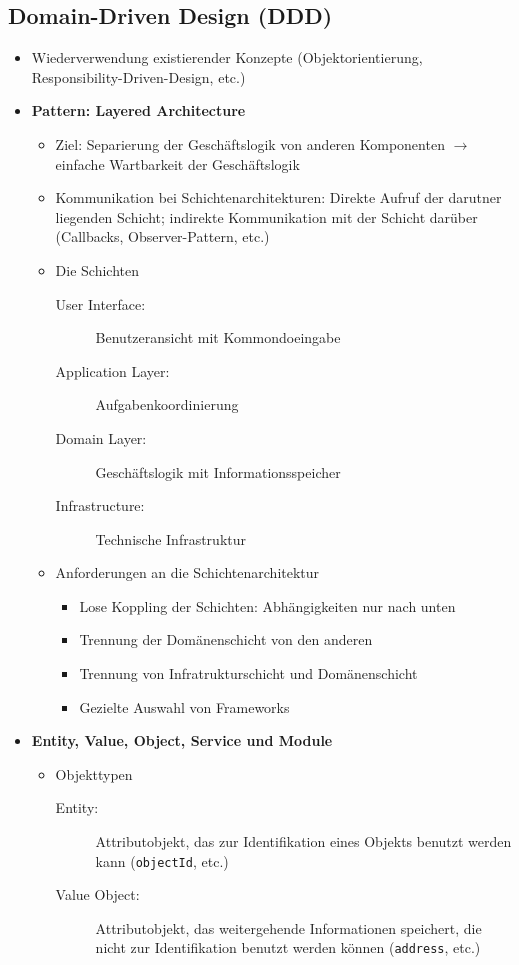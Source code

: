 \subsection{Domain-Driven Design (DDD)}
\begin{itemize}
	\item Wiederverwendung existierender Konzepte (Objektorientierung, Responsibility-Driven-Design, etc.)
	\item \textbf{Pattern: Layered Architecture}
	\begin{itemize}
		\item Ziel: Separierung der Geschäftslogik von anderen Komponenten \(\rightarrow\) einfache Wartbarkeit der Geschäftslogik
		\item Kommunikation bei Schichtenarchitekturen: Direkte Aufruf der darutner liegenden Schicht; indirekte Kommunikation mit der Schicht darüber (Callbacks, Observer-Pattern, etc.)
		\item Die Schichten
		\begin{description}
			\item[User Interface:] Benutzeransicht mit Kommondoeingabe
			\item[Application Layer:] Aufgabenkoordinierung
			\item[Domain Layer:] Geschäftslogik mit Informationsspeicher
			\item[Infrastructure:] Technische Infrastruktur
		\end{description}
		\item Anforderungen an die Schichtenarchitektur
		\begin{itemize}
			\item Lose Koppling der Schichten: Abhängigkeiten nur nach unten
			\item Trennung der Domänenschicht von den anderen
			\item Trennung von Infratrukturschicht und Domänenschicht
			\item Gezielte Auswahl von Frameworks
		\end{itemize}
	\end{itemize}
	\item \textbf{Entity, Value, Object, Service und Module}
	\begin{itemize}
		\item Objekttypen
		\begin{description}
			\item[Entity:] Attributobjekt, das zur Identifikation eines Objekts benutzt werden kann (\texttt{objectId}, etc.)
			\item[Value Object:] Attributobjekt, das weitergehende Informationen speichert, die nicht zur Identifikation benutzt werden können (\texttt{address}, etc.)

\end{description}
\end{itemize}
\end{itemize}
